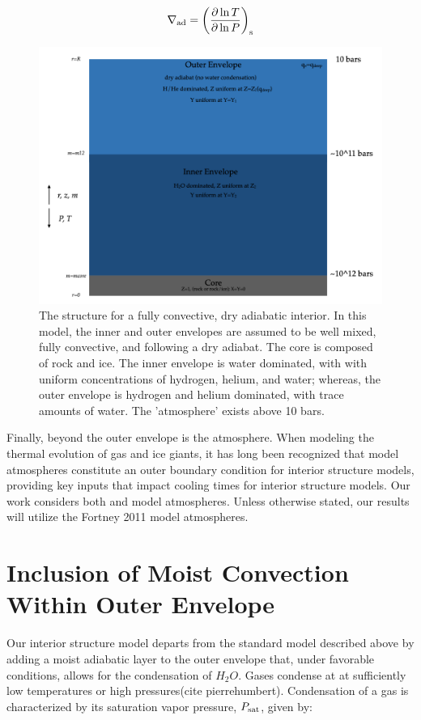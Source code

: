 \documentclass[11pt]{ucscthesisbs}
\begin{document}
\begin{equation}
\nabla_{\rm ad} = \left( \frac{\partial \ln T}{\partial \ln P} \right)_{\rm s}
\end{equation}

\begin{figure}[ht!]
 \centerline{
  \includegraphics[width=6.0in]{figures/structure_schematic_images/structure_schematic_images.001.png}
 }
\caption[A Standard Interior Structure Model]
{The structure for a fully convective, dry adiabatic interior. In this model, the inner and outer envelopes are assumed to be well mixed, fully convective, and following a dry adiabat. The core is composed of rock and ice. The inner envelope is water dominated, with with uniform concentrations of hydrogen, helium, and water; whereas, the outer envelope is hydrogen and helium dominated, with trace amounts of water. The 'atmosphere' exists above 10 bars.}
\label{fig:standard_dry_interior}
\end{figure}

Finally, beyond the outer envelope is the atmosphere. When modeling the thermal evolution of gas and ice giants, it has long been recognized that model atmospheres constitute an outer boundary condition for interior structure models, providing key inputs that impact cooling times for interior structure models. Our work considers both \citep{graboske_1975} and \citep{fortney_2011} model atmospheres. Unless otherwise stated, our results will utilize the Fortney 2011 model atmospheres. 

\section{Inclusion of Moist Convection Within Outer Envelope}
Our interior structure model departs from the standard model described above by adding a moist adiabatic layer to the outer envelope that, under favorable conditions, allows for the condensation of $H_{2}O$. Gases condense at at sufficiently low temperatures or high pressures(cite pierrehumbert). Condensation of a gas is characterized by its saturation vapor pressure, $P_{\rm sat}$, given by: 
\end{document}
